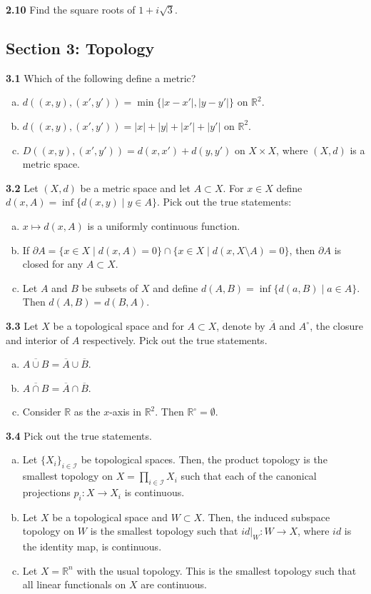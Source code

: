 \documentclass[11pt,a4paper]{article}
\newcommand{\R}{\mathbb{R}}
\newcommand{\examsec}[1]{%
  \subsection*{#1}
  \vspace{-2pt}
}
\newcommand{\qitem}[1]{\par\medskip\noindent\textbf{#1}\hspace{0.5em}}
\begin{document}
\qitem{2.10} Find the square roots of $1 + i\sqrt{3}$.

\examsec{Section 3: Topology}

\qitem{3.1} Which of the following define a metric?
\begin{enumerate}[a.]
  \item $d((x, y), (x', y')) = \min\{|x - x'|, |y - y'|\}$ on $\R^2$.
  \item $d((x, y), (x', y')) = |x| + |y| + |x'| + |y'|$ on $\R^2$.
  \item $D((x, y), (x', y')) = d(x, x') + d(y, y')$ on $X \times X$, where $(X, d)$ is a metric space.
\end{enumerate}

\qitem{3.2} Let $(X, d)$ be a metric space and let $A \subset X$. For $x \in X$ define $d(x, A) = \inf\{d(x, y) \mid y \in A\}$. Pick out the true statements:
\begin{enumerate}[a.]
  \item $x \mapsto d(x, A)$ is a uniformly continuous function.
  \item If $\partial A = \{x \in X \mid d(x, A) = 0\} \cap \{x \in X \mid d(x, X \setminus A) = 0\}$, then $\partial A$ is closed for any $A \subset X$.
  \item Let $A$ and $B$ be subsets of $X$ and define $d(A, B) = \inf\{d(a, B) \mid a \in A\}$. Then $d(A, B) = d(B, A)$.
\end{enumerate}

\qitem{3.3} Let $X$ be a topological space and for $A \subset X$, denote by $\overline{A}$ and $A^\circ$, the closure and interior of $A$ respectively. Pick out the true statements.
\begin{enumerate}[a.]
  \item $\overline{A \cup B} = \overline{A} \cup \overline{B}$.
  \item $\overline{A \cap B} = \overline{A} \cap \overline{B}$.
  \item Consider $\R$ as the $x$-axis in $\R^2$. Then $\R^\circ = \emptyset$.
\end{enumerate}

\qitem{3.4} Pick out the true statements.
\begin{enumerate}[a.]
  \item Let $\{X_i\}_{i \in \mathcal{I}}$ be topological spaces. Then, the product topology is the smallest topology on $X = \prod_{i \in \mathcal{I}} X_i$ such that each of the canonical projections $p_i : X \to X_i$ is continuous.
  \item Let $X$ be a topological space and $W \subset X$. Then, the induced subspace topology on $W$ is the smallest topology such that $id|_W : W \to X$, where $id$ is the identity map, is continuous.
  \item Let $X = \R^n$ with the usual topology. This is the smallest topology such that all linear functionals on $X$ are continuous.
\end{enumerate}
\end{document}
